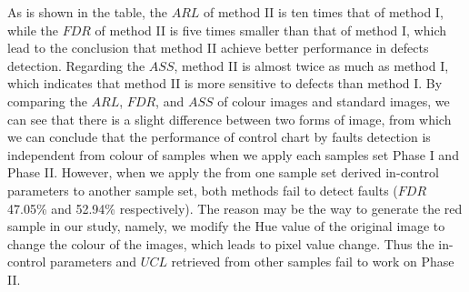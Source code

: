 As is shown in the table, the $ARL$ of method II is ten times that of method I, while the $FDR$ of method II is five times smaller than that of method I, which lead to the conclusion that method II achieve better performance in defects detection. Regarding the $ASS$, method II is almost twice as much as method I, which indicates that method II is more sensitive to defects than method I. By comparing the $ARL$, $FDR$, and $ASS$ of colour images and standard images, we can see that there is a slight difference between two forms of image, from which we can conclude that the performance of control chart by faults detection is independent from colour of samples when we apply each samples set Phase I and Phase II. However, when we apply the from one sample set derived in-control parameters to another sample set, both methods fail to detect faults ($FDR$ 47.05\% and 52.94\% respectively). The reason may be the way to generate the red sample in our study, namely, we modify the Hue value of the original image to change the colour of the images, which leads to pixel value change. Thus the in-control parameters and $UCL$ retrieved from other samples fail to work on Phase II.





























